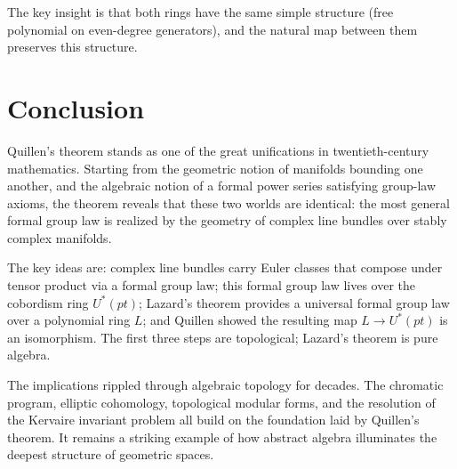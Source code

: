\documentclass[12pt]{article}
\theoremstyle{definition}
\theoremstyle{remark}
\newcommand{\Ustar}{U^*(pt)}
\begin{document}
The key insight is that both rings have the same simple structure (free polynomial on even-degree generators), and the natural map between them preserves this structure.

\section{Conclusion}\label{sec:conclusion}

Quillen's theorem stands as one of the great unifications in twentieth-century mathematics. Starting from the geometric notion of manifolds bounding one another, and the algebraic notion of a formal power series satisfying group-law axioms, the theorem reveals that these two worlds are identical: the most general formal group law is realized by the geometry of complex line bundles over stably complex manifolds.

The key ideas are: complex line bundles carry Euler classes that compose under tensor product via a formal group law; this formal group law lives over the cobordism ring $\Ustar$; Lazard's theorem provides a universal formal group law over a polynomial ring $L$; and Quillen showed the resulting map $L \to \Ustar$ is an isomorphism. The first three steps are topological; Lazard's theorem is pure algebra.

The implications rippled through algebraic topology for decades. The chromatic program, elliptic cohomology, topological modular forms, and the resolution of the Kervaire invariant problem all build on the foundation laid by Quillen's theorem. It remains a striking example of how abstract algebra illuminates the deepest structure of geometric spaces.



\end{document}
